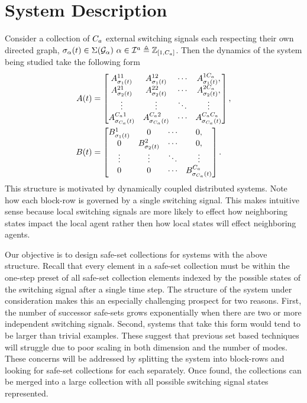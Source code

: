 \section{System Description}
Consider a collection of ${C_a}$ external switching signals each respecting their own directed graph, $\ss_\agentidx(t)\in\Sigma(\mathcal{G}_\agentidx)\ \agentidx\in\agentidxset\triangleq\int\rii{1}{\numagents}$. Then the dynamics of the system being studied take the following form
\begin{align}
A(t)&=\begin{bmatrix}
A^{11}_{{\sigma}_1(t)}&A^{12}_{{\sigma}_1(t)}&\cdots&A^{1{C_a}}_{{\sigma}_1(t)},\\
A^{21}_{{\sigma}_2(t)}&A^{22}_{{\sigma}_2(t)}&\cdots&A^{2{C_a}}_{{\sigma}_2(t)},\\
\vdots&\vdots & \ddots & \vdots\\
A^{{C_a} 1}_{{\sigma}_{{C_a}}(t)} & A^{{C_a} 2}_{{\sigma}_{{C_a}}(t)} &\cdots & A^{{C_a} {C_a}}_{{\sigma}_{{C_a}}(t)} 
\end{bmatrix},\\
B(t)&=\begin{bmatrix}
B^{1}_{{\sigma}_1(t)}&0&\cdots&0,\\
0&B^{2}_{{\sigma}_2(t)}&\cdots&0,\\
\vdots&\vdots & \ddots & \vdots\\
0 & 0 &\cdots & B^{{C_a}}_{{\sigma}_{{C_a}}(t)} 
\end{bmatrix}.
\end{align}
This structure is motivated by dynamically coupled distributed systems. Note how each block-row is governed by a single switching signal. This makes intuitive sense because local switching signals are more likely to effect how neighboring states impact the local agent rather then how local states will effect neighboring agents.

Our objective is to design safe-set collections for systems with the above structure. Recall that every element in a safe-set collection must be within the one-step preset of all safe-set collection elements indexed by the possible states of the switching signal after a single time step. The structure of the system under consideration makes this an especially challenging prospect for two reasons. First, the number of successor safe-sets grows exponentially when there are two or more independent switching signals. Second, systems that take this form would tend to be larger than trivial examples. These suggest that previous set based techniques will struggle due to poor scaling in both dimension and the number of modes. These concerns will be addressed by splitting the system into block-rows and looking for safe-set collections for each separately. Once found, the collections can be merged into a large collection with all possible switching signal states represented.

